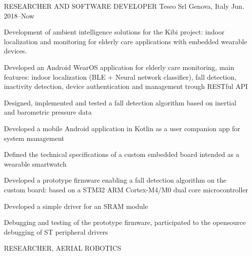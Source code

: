 

\begin{cventries}

  \cventry
    {RESEARCHER AND SOFTWARE DEVELOPER} %
    {Teseo Srl} %
    {Genova, Italy} %
    {Jun. 2018--Now} %
    {
      \begin{cvparagraph}
      Development of ambient intelligence solutions for the Kibi project: indoor localization and monitoring for elderly care applications with embedded wearable devices.
      \end{cvparagraph}
      \begin{cvitems} %
        \item {Developed an Android WearOS application for elderly care monitoring, main features: indoor localization (BLE + Neural network classifier), fall detection, inactivity detection, device authentication and management trough RESTful API}
        \item {Designed, implemented and tested a fall detection algorithm based on inertial and barometric pressure data}
        \item {Developed a mobile Android application in Kotlin as a user companion app for system management}
        \item {Defined the technical specifications of a custom embedded board intended as a wearable smartwatch}
        \item {
          Developed a prototype firmware enabling a fall detection algorithm on the custom board: based on a STM32 ARM Cortex-M4/M0 dual core microcontroller
        }
        \item{Developed a simple driver for an SRAM module}
        \item{Debugging and testing of the prototype firmware, participated to the opensource debugging of ST peripheral drivers} 
      \end{cvitems}
    }
  \cventry
    {RESEARCHER, AERIAL ROBOTICS} %

\end{cventries}
